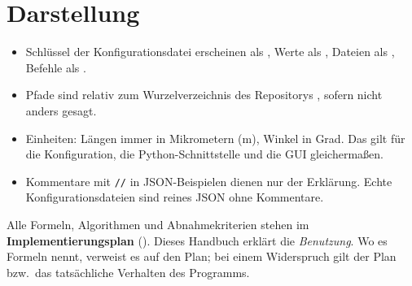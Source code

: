 \section{Darstellung}
\begin{itemize}
  \item Schlüssel der Konfigurationsdatei erscheinen als , Werte als , Dateien als
        , Befehle als .
  \item Pfade sind relativ zum Wurzelverzeichnis des Repositorys , sofern nicht anders gesagt.
  \item Einheiten: Längen immer in Mikrometern (\textmu m), Winkel in Grad. Das gilt für die Konfiguration, die
        Python-Schnittstelle und die GUI gleichermaßen.
  \item Kommentare mit \texttt{//} in JSON-Beispielen dienen nur der Erklärung. Echte Konfigurationsdateien sind
        reines JSON ohne Kommentare.
\end{itemize}

\begin{hinweis}
Alle Formeln, Algorithmen und Abnahmekriterien stehen im \textbf{Implementierungsplan}
(). Dieses Handbuch erklärt die \emph{Benutzung}. Wo es Formeln nennt,
verweist es auf den Plan; bei einem Widerspruch gilt der Plan bzw.\ das tatsächliche Verhalten des Programms.
\end{hinweis}
